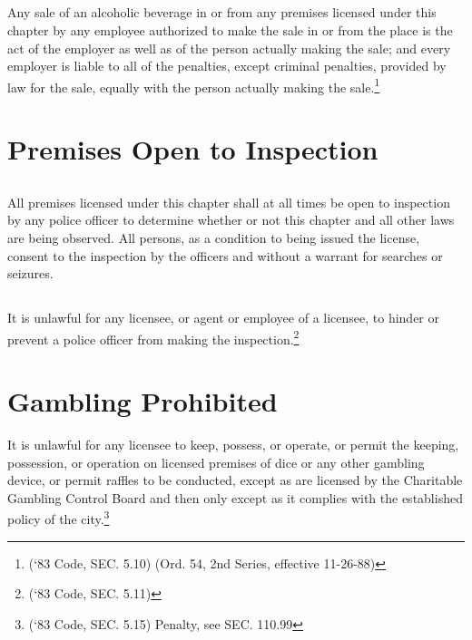 \subsection{}
Any sale of an alcoholic beverage in or from any premises licensed under this chapter by any employee authorized to make the sale in or from the place is the act of the employer as well as of the person actually making the sale; and every employer is liable to all of the penalties, except criminal penalties, provided by law for the sale, equally with the person actually making the sale.\footnote{(‘83 Code, SEC. 5.10)  (Ord. 54, 2nd Series, effective 11-26-88)}

\section{Premises Open to Inspection}
\subsection{}
All premises licensed under this chapter shall at all times be open to inspection by any police officer to determine whether or not this chapter and all other laws are being observed.  All persons, as a condition to being issued the license, consent to the inspection by the officers and without a warrant for searches or seizures.
\subsection{}
It is unlawful for any licensee, or agent or employee of a licensee, to hinder or prevent a police officer from making the inspection.\footnote{(‘83 Code, SEC. 5.11)}

\section{Gambling Prohibited}
It is unlawful for any licensee to keep, possess, or operate, or permit the keeping, possession, or operation on licensed premises of dice or any other gambling device, or permit raffles to be conducted, except as are licensed by the Charitable Gambling Control Board and then only except as it complies with the established policy of the city.\footnote{(‘83 Code, SEC. 5.15)  Penalty, see SEC. 110.99}


